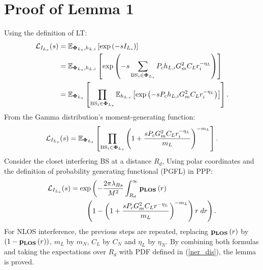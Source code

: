 \documentclass[journal]{IEEEtran}
\begin{document}
\section{Proof of Lemma 1 }
Using the definition of LT:
\small
\begin{equation}
\begin{aligned}[b]
\mathcal{L}_{I_{L_s}} (s)&=\mathbb{E}_{\bold\Phi_{L_s},h_{L,i}}\left[\exp\left(-sI_{L_s}\right)\right]\\
&=\mathbb{E}_{\bold\Phi_{L_s},h_{L,i}}\left[\exp\left(-s \sum\limits_{\substack{\text{BS}_i\in \bold\Phi_{L_s}}}   P_c h_{L,i}G_m^2 C_L r_i^{-\eta_L} \right)\right]\\
&=\mathbb{E}_{\bold\Phi_{L_s}}\left[\prod\limits_{\substack{\text{BS}_i\in \bold\Phi_{L_s}}}\mathbb{E}_{h_{L,i}}\left[\exp\left(- s P_c h_{L,i}G_m^2 C_L r_i^{-\eta_L}\right)\right]\right].\\
\end{aligned}
\end{equation}
\normalsize
From the Gamma distribution's moment-generating function:
\begin{equation}
\mathcal{L}_{I_{L_s}} (s)=\mathbb{E}_{\bold\Phi_{L_s}}\left[\prod\limits_{\substack{\text{BS}_i\in \bold\Phi_{L_s}}}\left(1+\frac{ s P_c G_m^2 C_L r_i^{-\eta_L}}{m_L}\right)^{-m_L}\right].
\end{equation}
Consider the closet interfering BS at a distance $R_d$, Using polar coordinates and the definition of probability generating functional (PGFL) in PPP:
\begin{equation}
\begin{aligned}
\mathcal{L}_{I_{L_s}} (s)&=\exp\left(-  \frac{2 \pi \lambda_{Bs}}{M^2}    \int_{ R_d}^{\infty}\bold p_{\bold{LOS}}\left(r\right) \right.\\
& \quad \quad \left. \left(1-\left( 1+\frac{s P_c G_m^2 C_L r^{-\eta_L}}{m_L}\right)^{-m_L}    \right) r\;dr  \right).
\end{aligned}
\end{equation}
For NLOS interference, the previous steps are repeated, replacing $\bold p_{\bold{LOS}}\left(r\right)$ by $\left(1-\bold p_{\bold{LOS}}\left(r\right)\right)$, $m_L$ by $m_N$, $C_L$ by $C_N$  and $\eta_L$ by $\eta_N$.
By combining both formulas and taking the expectations over $R_d$ with PDF defined in (\ref{ner_dis}), the lemma is proved.
\end{document}
